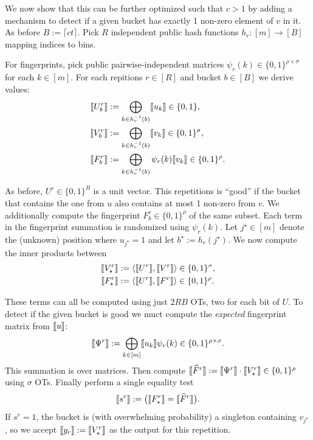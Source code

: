 We now show that this can be further optimized such that $c>1$ by adding a mechanism to detect if a given bucket has exactly 1 non-zero element of $v$ in it. As before $B:=\lceil ct\rceil$. Pick $R$ independent public hash functions $h_r:[m]\to[B]$ mapping indices to bins.

For fingerprints, pick public pairwise-independent matrices $\psi_r(k)\in\{0,1\}^{\rho\times \sigma}$ for each $k\in[m]$. For each repitions $r\in [R]$ and bucket $b\in [B]$ we derive values:
\begin{align*}
\share{U^{r}_b} &:= \bigoplus_{k\in h_r^{-1}(b)}  \share{u_k}\in\{0,1\},\\
\share{V^{r}_b} &:= \bigoplus_{k\in h_r^{-1}(b)} \share{v_k}\in\{0,1\}^\sigma,\\
\share{F^{r}_b} &:= \bigoplus_{k\in h_r^{-1}(b)} \psi_r(k)\share{v_k}\in\{0,1\}^{\rho}.
\end{align*}

As before, $U^r\in \{0,1\}^B$ is a unit vector. This repetitions is ``good'' if the bucket that contains the one from $u$ also contains at most 1 non-zero from $v$. We additionally compute the fingerprint $F^{r}_b\in \{0,1\}^\rho$ of the same subset. Each term in the fingerprint summation is randomized using $\psi_r(k)$. Let $j^\star\in [m]$ denote the (unknown) position where $u_{j^\star}=1$ and let $b^\star:=h_r(j^\star)$. We now compute the inner products between
\begin{align*}
    \share{V^{r}_\star} &:= \langle \share{U^r}, \share{V^{r}} \rangle \in\{0,1\}^\sigma,\\
    \share{F^{r}_\star} &:= \langle \share{U^r}, \share{F^{r}} \rangle  \in\{0,1\}^{\rho}.
\end{align*}

These terms can all be computed using just $2RB$ OTs, two for each bit of $U$. To detect if the given bucket is good we muct compute the \emph{expected} fingerprint matrix from $\share{u}$:
\[
\share{\Psi^{r}} := \bigoplus_{k\in [m]} \share{u_k}\psi_r(k) \in \{0,1\}^{\rho\times \sigma}.
\]
This summation is over matrices. Then compute $\share{\widehat{F}^{r}}:=\share{\Psi^{r}}\cdot \share{V^{r}_\star}\in\{0,1\}^{\rho}$ using $\sigma$ OTs. Finally perform a single equality test
\[
\share{s^{r}} := \big(\share{F^{r}_\star} = \share{\widehat{F}^{r}}\big).
\]
If $s^{r}=1$, the bucket is (with overwhelming probability) a singleton containing $v_{j^\star}$, so we accept $\share{y_r}:=\share{V^{r}_\star}$ as the output for this repetition.


